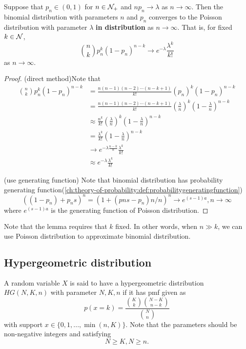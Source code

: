 \begin{refsection}
\begin{lemma}
Suppose that $p_n\in (0,1)$ for $n\in \mathcal{N}_+$ and $np_n\to \lambda$ as $n\to \infty$. Then the binomial distribution with parameters $n$ and $p_n$ converges to the Poisson distribution with parameter $\lambda$ \textbf{in distribution}  as $n\to \infty$. That is, for fixed $k\in \mathcal{N}$, 
$$\binom{n}{k}p_n^k(1-p_n)^{n-k} \to e^{-\lambda}\frac{\lambda^k}{k!}$$
as $n\to \infty$.
\end{lemma}
\begin{proof}
(direct method)Note that
\begin{align*}
\binom{n}{k}p_n^k(1-p_n)^{n-k} &=\frac{n(n-1)(n-2)\cdots(n-k+1)}{k!}(p_n)^k(1-p_n)^{n-k} \\
&=\frac{n(n-1)(n-2)\cdots(n-k+1)}{k!}(\frac{\lambda}{n})^k(1-\frac{\lambda}{n})^{n-k} \\
&\approx\frac{n^k}{k!}(\frac{\lambda}{n})^k(1-\frac{\lambda}{n})^{n-k} \\
&=\frac{\lambda^k}{k!}(1-\frac{\lambda}{n})^{n-k}\\
&\to e^{-\lambda \frac{n-k}{n}} \frac{\lambda^k}{k!}\\
&\approx e^{-\lambda} \frac{\lambda^k}{k!}
\end{align*}

(use generating function)
Note that binomial distribution has probability generating function(\autoref{ch:theory-of-probability:def:probabilitygeneratingfunction})
$$((1-p_n)+p_ns)^n = (1 + (pns-p_n)n/n)^n \to e^{(s-1)a},n\to\infty$$
where $e^{(s-1)a}$ is the generating function of Poisson distribution.
\end{proof}

\begin{remark}
Note that the lemma requires that $k$ fixed. In other words, when $n\gg k$, we can use Poisson distribution to approximate binomial distribution.
\end{remark}

\subsection{Hypergeometric distribution}
\begin{definition}\cite[148]{hoggintroduction}
	A random variable $X$ is said to have a hypergeometric distribution $HG(N,K,n)$ with parameter $N,K,n$ if it has pmf given as
	$$p(x = k) = \frac{\binom{K}{k}\binom{N-K}{n-k}}{\binom{N}{n}} $$
	with support $x\in \{0,1,...,\min(n,K)\}$. Note that the parameters should be non-negative integers and satisfying $$N\geq K, N\geq n.$$


\end{definition}
\end{refsection}
